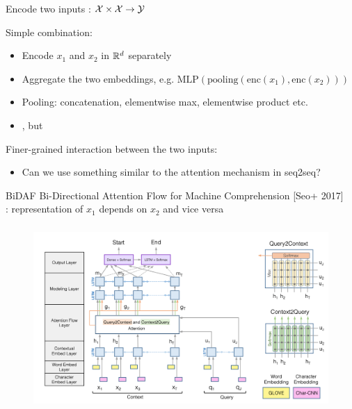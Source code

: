 \documentclass[usenames,dvipsnames,11pt,aspectratio=169]{beamer}
\begin{document}
\begin{frame}
    {Encode two inputs}
    : $\mathcal{X} \times \mathcal{X} \rightarrow \mathcal{Y}$

    Simple combination:\\
    \begin{itemize}
        \item Encode $x_1$ and $x_2$ in $\mathbb{R}^d$ separately
        \item Aggregate the two embeddings, e.g. $\text{MLP}(\text{pooling}(\text{enc}(x_1), \text{enc}(x_2)))$
        \item Pooling: concatenation, elementwise max, elementwise product etc.
        \item {}, but 
    \end{itemize}

    Finer-grained interaction between the two inputs:\\
    \begin{itemize}
        \item Can we use something similar to the attention mechanism in seq2seq?
    \end{itemize}
            \vspace{7em}
\end{frame}

\begin{frame}
    {BiDAF}
    Bi-Directional Attention Flow for Machine Comprehension [Seo+ 2017]\\
    : representation of $x_1$ depends on $x_2$ and vice versa
    \vspace{-1em}
    \begin{figure}
        \includegraphics[height=7cm]{figures/bidaf}
    \end{figure}
\end{frame}
\end{document}
